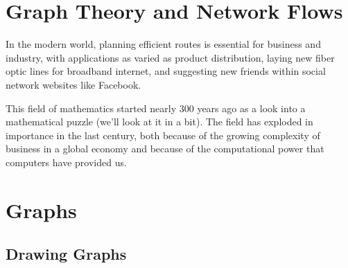 \newcommand{\sout}{}

\section{Graph Theory and Network Flows}
In the modern world, planning efficient routes is essential for business and industry, with applications as varied as product distribution, laying new fiber optic lines for broadband internet, and suggesting new friends within social network websites like Facebook.

This field of mathematics started nearly 300 years ago as a look into a mathematical puzzle (we'll look at it in a bit).  The field has exploded in importance in the last century, both because of the growing complexity of business in a global economy and because of the computational power that computers have provided us.  
\section{Graphs}
\subsection{Drawing Graphs}

